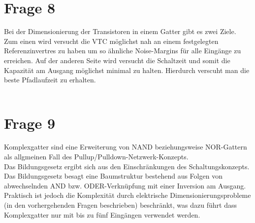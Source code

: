 \documentclass[a4paper]{scrartcl}
\begin{document}
\section*{Frage 8}
Bei der Dimensionierung der Transistoren in einem Gatter gibt es zwei Ziele. Zum einen wird versucht die VTC möglichst nah an einem festgelegten Referenzinvertres zu haben um so ähnliche Noise-Margins für alle Eingänge zu erreichen. Auf der anderen Seite wird versucht die Schaltzeit und somit die Kapazität am Ausgang möglichst minimal zu halten. Hierdurch verscuht man die beste Pfadlaufzeit zu erhalten.
~\\
~\\
\section*{Frage 9}
Komplexgatter sind eine Erweiterung von NAND beziehungsweise NOR-Gattern als allgmeinen Fall des Pullup/Pulldown-Netzwerk-Konzepts.\\
Das Bildungsgesetz ergibt sich aus den Einschränkungen des Schaltungskonzepts. Das Bildungsgesetz besagt eine Baumstruktur bestehend aus Folgen von abwechselnden AND bzw. ODER-Verknüpfung mit einer Inversion am Ausgang.\\
Praktisch ist jedoch die Komplexität durch elektrische Dimensionierungsprobleme (in den vorhergehenden Fragen beschrieben) beschränkt, was dazu führt dass Komplexgatter nur mit bis zu fünf Eingängen verwendet werden.
~\\
~\\
\end{document}
